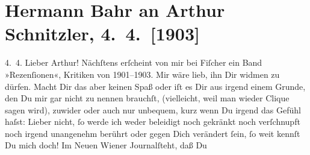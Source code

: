 

         
         \renewcommand{\erwaehntePersonen}{Personen: Hermann Bahr, Rosa Bahr, Samuel Fischer, Olga Schnitzler}
         \renewcommand{\erwaehnteOrte}{Orte: Konservatorium der Gesellschaft der Musikfreunde, Wien}
         \renewcommand{\erwaehnteWerke}{Werke: Neues Wiener Journal, Rezensionen. Wiener Theater 1901 bis 1903}
               \section[Hermann Bahr an Arthur Schnitzler, 4. 4. {[}1903{]}]{ Hermann Bahr an Arthur Schnitzler, 4. 4. {[}1903{]}}\nopagebreak{}\rehead{ }\begin{ledgroupsized}[t]{13cm}\normalsize\beginnumbering \toendnotes[C]{\smallbreak\pagebreak[2]} 
\toendnotes[C]{\smallbreak}\pstart
           \raggedleft{}{\pb}4. 4.\pend
           \pstart\center{}Lieber Arthur!\pend\pstart
           Nächſtens erſcheint von mir bei Fiſcher ein
               Band »Rezenſionen«, Kritiken von 1901–1903. Mir
               wäre lieb, ihn Dir widmen zu dürfen. Macht Dir das aber keinen Spaß oder iſt es Dir
               aus irgend einem Grunde, den Du mir gar nicht zu nennen brauchſt, (vielleicht, weil
               man wieder Clique sagen wird), zuwider oder auch nur unbequem, kurz wenn Du irgend
               das Gefühl haſst: Lieber nicht, ſo werde ich weder beleidigt noch gekränkt noch
               verſchnupft noch irgend unangenehm berührt oder gegen Dich verändert ſein, ſo weit
               kennſt Du mich doch!{\pb}\pend
           \pstart
           Im Neuen Wiener Journalſteht, daß Du \label{K_L01286-1v}
\end{ledgroupsized}
